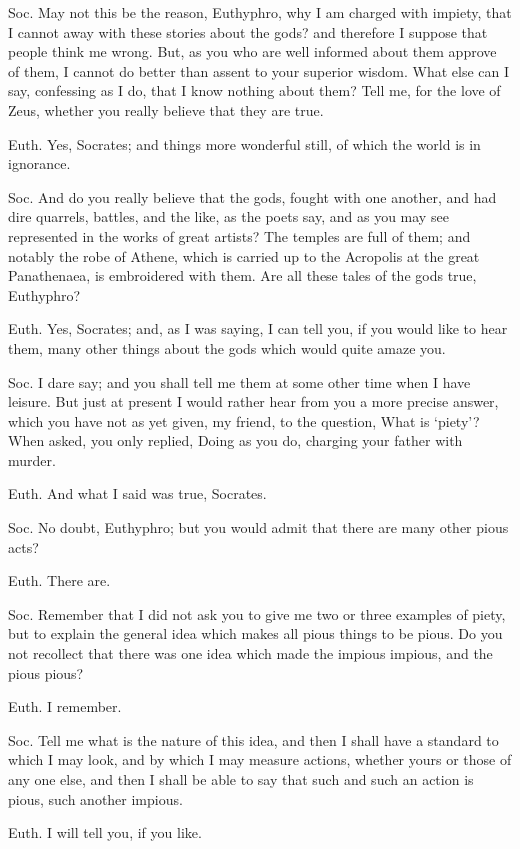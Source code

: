 Soc. May not this be the reason, Euthyphro, why I am charged with impiety, that I cannot away with these stories about the gods? and therefore I suppose that people think me wrong. But, as you who are well informed about them approve of them, I cannot do better than assent to your superior wisdom. What else can I say, confessing as I do, that I know nothing about them? Tell me, for the love of Zeus, whether you really believe that they are true.

Euth. Yes, Socrates; and things more wonderful still, of which the world is in ignorance.

Soc. And do you really believe that the gods, fought with one another, and had dire quarrels, battles, and the like, as the poets say, and as you may see represented in the works of great artists? The temples are full of them; and notably the robe of Athene, which is carried up to the Acropolis at the great Panathenaea, is embroidered with them. Are all these tales of the gods true, Euthyphro?

Euth. Yes, Socrates; and, as I was saying, I can tell you, if you would like to hear them, many other things about the gods which would quite amaze you.

Soc. I dare say; and you shall tell me them at some other time when I have leisure. But just at present I would rather hear from you a more precise answer, which you have not as yet given, my friend, to the question, What is `piety'? When asked, you only replied, Doing as you do, charging your father with murder.

Euth. And what I said was true, Socrates.

Soc. No doubt, Euthyphro; but you would admit that there are many other pious acts?

Euth. There are.

Soc. Remember that I did not ask you to give me two or three examples of piety, but to explain the general idea which makes all pious things to be pious. Do you not recollect that there was one idea which made the impious impious, and the pious pious?

Euth. I remember.

Soc. Tell me what is the nature of this idea, and then I shall have a standard to which I may look, and by which I may measure actions, whether yours or those of any one else, and then I shall be able to say that such and such an action is pious, such another impious.

Euth. I will tell you, if you like.

